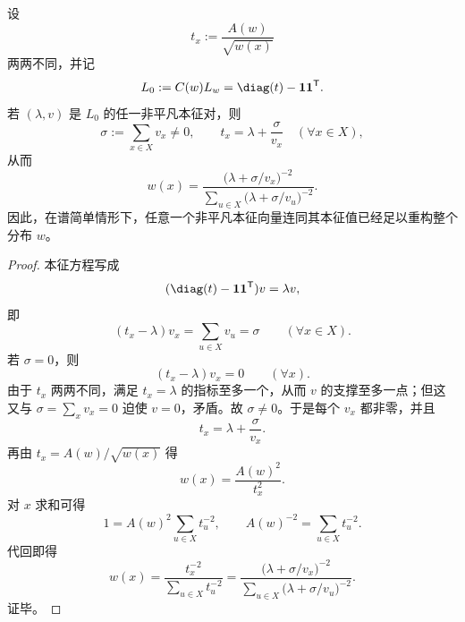 \begin{theorem}[单一非平凡本征对的分布恢复定理]\label{thm:conclusion-critical-kernel-single-eigenpair-recovers-distribution}
设
\[
t_x:=\frac{A(w)}{\sqrt{w(x)}}
\]
两两不同，并记
\[
L_0:=C(w)L_w=\diag(t)-\mathbf 1\mathbf 1^{\mathsf T}.
\]
若 \((\lambda,v)\) 是 \(L_0\) 的任一非平凡本征对，则
\[
\sigma:=\sum_{x\in X}v_x\ne 0,
\qquad
t_x=\lambda+\frac{\sigma}{v_x}\quad(\forall x\in X),
\]
从而
\[
w(x)
=
\frac{\bigl(\lambda+\sigma/v_x\bigr)^{-2}}
{\sum_{u\in X}\bigl(\lambda+\sigma/v_u\bigr)^{-2}}.
\]
因此，在谱简单情形下，任意一个非平凡本征向量连同其本征值已经足以重构整个分布 \(w\)。
\end{theorem}
\begin{proof}
本征方程写成
\[
(\diag(t)-\mathbf 1\mathbf 1^{\mathsf T})v=\lambda v,
\]
即
\[
(t_x-\lambda)v_x=\sum_{u\in X}v_u=\sigma
\qquad(\forall x\in X).
\]
若 \(\sigma=0\)，则
\[
(t_x-\lambda)v_x=0\qquad(\forall x).
\]
由于 \(t_x\) 两两不同，满足 \(t_x=\lambda\) 的指标至多一个，从而 \(v\) 的支撑至多一点；但这又与 \(\sigma=\sum_x v_x=0\) 迫使 \(v=0\)，矛盾。故 \(\sigma\ne 0\)。于是每个 \(v_x\) 都非零，并且
\[
t_x=\lambda+\frac{\sigma}{v_x}.
\]
再由 \(t_x=A(w)/\sqrt{w(x)}\) 得
\[
w(x)=\frac{A(w)^2}{t_x^2}.
\]
对 \(x\) 求和可得
\[
1=A(w)^2\sum_{u\in X}t_u^{-2},
\qquad
A(w)^{-2}=\sum_{u\in X}t_u^{-2}.
\]
代回即得
\[
w(x)
=
\frac{t_x^{-2}}{\sum_{u\in X}t_u^{-2}}
=
\frac{\bigl(\lambda+\sigma/v_x\bigr)^{-2}}
{\sum_{u\in X}\bigl(\lambda+\sigma/v_u\bigr)^{-2}}.
\]
证毕。
\end{proof}

